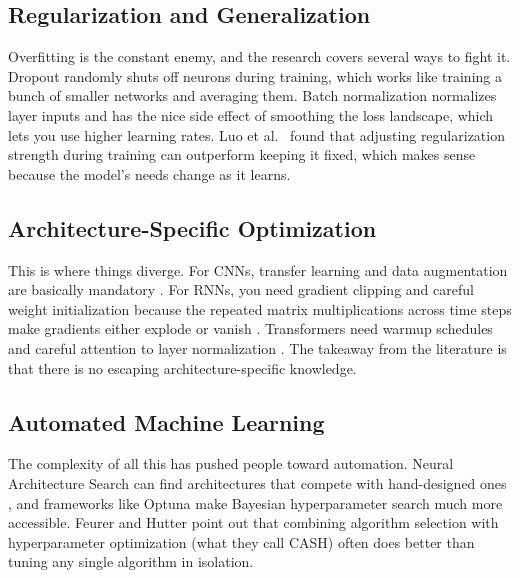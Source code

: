 \documentclass[12pt, letterpaper]{article}
\begin{document}
\subsection{Regularization and Generalization}

Overfitting is the constant enemy, and the research covers several ways to fight it. Dropout \cite{srivastava2014dropout} randomly shuts off neurons during training, which works like training a bunch of smaller networks and averaging them. Batch normalization \cite{ioffe2015batch} normalizes layer inputs and has the nice side effect of smoothing the loss landscape, which lets you use higher learning rates. Luo et al.\ \cite{luo2019adaptive} found that adjusting regularization strength during training can outperform keeping it fixed, which makes sense because the model's needs change as it learns.

\subsection{Architecture-Specific Optimization}

This is where things diverge. For CNNs, transfer learning and data augmentation are basically mandatory \cite{he2019bag}. For RNNs, you need gradient clipping and careful weight initialization because the repeated matrix multiplications across time steps make gradients either explode or vanish \cite{pascanu2013difficulty}. Transformers need warmup schedules and careful attention to layer normalization \cite{vaswani2017attention}. The takeaway from the literature is that there is no escaping architecture-specific knowledge.

\subsection{Automated Machine Learning}

The complexity of all this has pushed people toward automation. Neural Architecture Search can find architectures that compete with hand-designed ones \cite{zoph2018learning}, and frameworks like Optuna make Bayesian hyperparameter search much more accessible. Feurer and Hutter \cite{feurer2019hyperparameter} point out that combining algorithm selection with hyperparameter optimization (what they call CASH) often does better than tuning any single algorithm in isolation.

\end{document}
